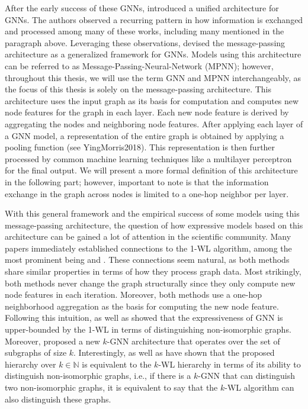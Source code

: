 After the early success of these GNNs, \cite{Gil+2017} introduced a unified architecture for GNNs. The authors observed a recurring pattern in how information is exchanged and processed among many of these works, including many mentioned in the paragraph above. Leveraging these observations, \cite{Gil+2017} devised the message-passing architecture as a generalized framework for GNNs. Models using this architecture can be referred to as Message-Passing-Neural-Network (MPNN); however, throughout this thesis, we will use the term GNN and MPNN interchangeably, as the focus of this thesis is solely on the message-passing architecture. 
This architecture uses the input graph as its basis for computation and computes new node features for the graph in each layer. Each new node feature is derived by aggregating the nodes and neighboring node features. After applying each layer of a GNN model, a representation of the entire graph is obtained by applying a pooling function (see YingMorris2018). This representation is then further processed by common machine learning techniques like a multilayer perceptron for the final output. We will present a more formal definition of this architecture in the following part; however, important to note is that the information exchange in the graph across nodes is limited to a one-hop neighbor per layer.
 
With this general framework and the empirical success of some models using this message-passing architecture, the question of how expressive models based on this architecture can be gained a lot of attention in the scientific community. Many papers immediately established connections to the 1-WL algorithm, among the most prominent being \cite{Morris2018} and \cite{Xu2018}. These connections seem natural, as both methods share similar properties in terms of how they process graph data. Most strikingly, both methods never change the graph structurally since they only compute new node features in each iteration. Moreover, both methods use a one-hop neighborhood aggregation as the basis for computing the new node feature. Following this intuition, \cite{Morris2018} as well as \cite{Xu2018} showed that the expressiveness of GNN is upper-bounded by the 1-WL in terms of distinguishing non-isomorphic graphs. Moreover, \cite{Morris2018} proposed a new $k$-GNN architecture that operates over the set of subgraphs of size $k$. Interestingly, \cite{Geerts2020} as well as \cite{Gro2017} have shown that the proposed hierarchy over $k \in \mathbb{N}$ is equivalent to the $k$-WL hierarchy in terms of its ability to distinguish non-isomorphic graphs, i.e., if there is a $k$-GNN that can distinguish two non-isomorphic graphs, it is equivalent to say that the $k$-WL algorithm can also distinguish these graphs.

